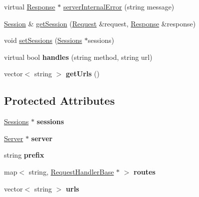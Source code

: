 \begin{DoxyCompactItemize}
\item 
virtual \hyperlink{classMongoose_1_1Response}{Response} $\ast$ \hyperlink{classMongoose_1_1Controller_ae1297f77e5e3124a68f1113727934834}{server\+Internal\+Error} (string message)
\item 
\hyperlink{classMongoose_1_1Session}{Session} \& \hyperlink{classMongoose_1_1Controller_abc99e0d6d1a10d3540cf05b72aa06e63}{get\+Session} (\hyperlink{classMongoose_1_1Request}{Request} \&request, \hyperlink{classMongoose_1_1Response}{Response} \&response)
\item 
void \hyperlink{classMongoose_1_1Controller_a66683621a71e59f898fcee200f3196c4}{set\+Sessions} (\hyperlink{classMongoose_1_1Sessions}{Sessions} $\ast$sessions)
\item 
virtual bool {\bfseries handles} (string method, string url)\hypertarget{classMongoose_1_1Controller_aa98fc750ce722bce0f7e5ff546ea3fe4}{}\label{classMongoose_1_1Controller_aa98fc750ce722bce0f7e5ff546ea3fe4}

\item 
vector$<$ string $>$ {\bfseries get\+Urls} ()\hypertarget{classMongoose_1_1Controller_a214cffbb67045b3ccbd60cf11bd5b05c}{}\label{classMongoose_1_1Controller_a214cffbb67045b3ccbd60cf11bd5b05c}

\end{DoxyCompactItemize}
\subsection*{Protected Attributes}
\begin{DoxyCompactItemize}
\item 
\hyperlink{classMongoose_1_1Sessions}{Sessions} $\ast$ {\bfseries sessions}\hypertarget{classMongoose_1_1Controller_a5721ad564526733206058cd62ff9ebdd}{}\label{classMongoose_1_1Controller_a5721ad564526733206058cd62ff9ebdd}

\item 
\hyperlink{classMongoose_1_1Server}{Server} $\ast$ {\bfseries server}\hypertarget{classMongoose_1_1Controller_a811645920fdeb285df467f3e0ecd2137}{}\label{classMongoose_1_1Controller_a811645920fdeb285df467f3e0ecd2137}

\item 
string {\bfseries prefix}\hypertarget{classMongoose_1_1Controller_aff921018e75abc2d7c1d6206a619e520}{}\label{classMongoose_1_1Controller_aff921018e75abc2d7c1d6206a619e520}

\item 
map$<$ string, \hyperlink{classMongoose_1_1RequestHandlerBase}{Request\+Handler\+Base} $\ast$ $>$ {\bfseries routes}\hypertarget{classMongoose_1_1Controller_a5adcae7c9bf7e95c5e45b966655c0780}{}\label{classMongoose_1_1Controller_a5adcae7c9bf7e95c5e45b966655c0780}

\item 
vector$<$ string $>$ {\bfseries urls}\hypertarget{classMongoose_1_1Controller_a14c823d051b5ae31403bea02941e4b2c}{}\label{classMongoose_1_1Controller_a14c823d051b5ae31403bea02941e4b2c}

\end{DoxyCompactItemize}


